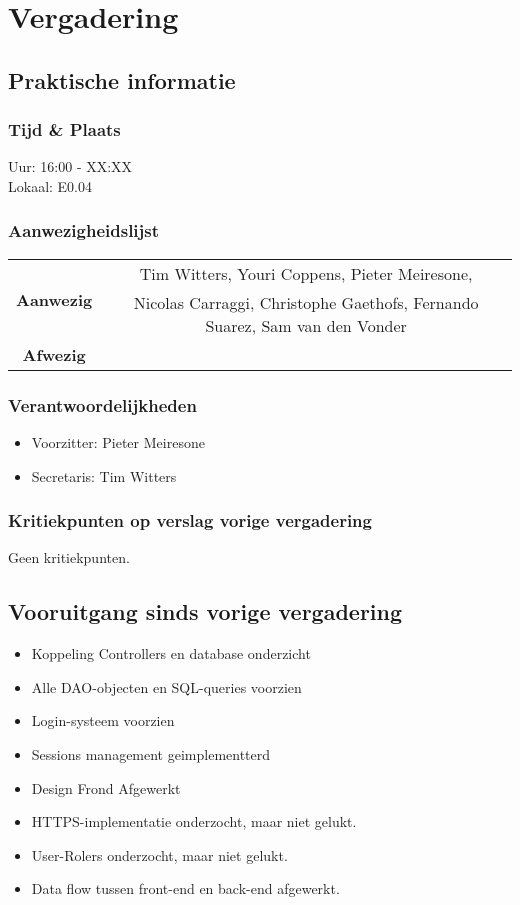 \section{Vergadering \MeetingDate}
\subsection{Praktische informatie}
\subsubsection{Tijd \& Plaats}
Uur: 16:00 - XX:XX
\\
Lokaal: E0.04
\subsubsection{Aanwezigheidslijst}
\begin{table}[htbp]
	\centering
	\begin{tabular}{c|c}
		\multirow{2}{*}{\textbf{Aanwezig}} & Tim Witters, Youri Coppens, Pieter Meiresone, \\
		& Nicolas Carraggi,  Christophe Gaethofs, Fernando Suarez, Sam van den Vonder \\
		\hline
		\textbf{Afwezig} & \\
	\end{tabular}
\end{table}

\subsubsection{Verantwoordelijkheden}
\begin{itemize}
	\item Voorzitter: Pieter Meiresone
	\item Secretaris: Tim Witters
\end{itemize}

\subsubsection{Kritiekpunten op verslag vorige vergadering}
Geen kritiekpunten.

\subsection{Vooruitgang sinds vorige vergadering}
\begin{itemize}
	\item Koppeling Controllers en database onderzicht
	\item Alle DAO-objecten en SQL-queries voorzien
	\item Login-systeem voorzien
	\item Sessions management geimplementterd
	\item Design Frond Afgewerkt
	\item HTTPS-implementatie onderzocht, maar niet gelukt.
	\item User-Rolers onderzocht, maar niet gelukt.
	\item Data flow tussen front-end en back-end afgewerkt.
\end{itemize}

